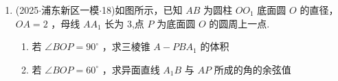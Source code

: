 \begin{enumerate}
\begin{jieda}
\begin{enumerate}
            方法二: 因为 ${PA} \bot$ 平面 ${ABCD},{AC},{AD},{CD} \subset$ 平面 ${ABCD}$ , 所以 ${PA} \bot  {AC},{PA} \bot  {AD},{PA} \bot  {CD}$ 且 $\angle {PCA}$ 就是 ${PC}$ 与平面 ${ABCD}$ 所成的角,又因为四边形 ${ABCD}$ 为矩形,所以 ${AB} \bot  {AD}$ ,分别以射线 ${AB},{AD},{AP}$ 为 $x,y,z$ 轴的正半轴,建立空间直角坐标系 $A - {xyz}$ ,设 ${AB} = t,{\vv{n}}_{1} = \left( {x,y,1}\right)$ 是平面 ${AEC}$ 的一个法向量,二面角 $D - {AE} - C$ 的大小为 $\theta$ ,

            由 $\tan \angle {PCA} = \dfrac{PA}{AC} = \dfrac{2}{\sqrt{{12} + {t}^{2}}} = \dfrac{1}{3}$ ,可得 $t = 2\sqrt{6}$ ,

            则 $\vv{AC} = \left( {2\sqrt{6},2\sqrt{3},0}\right) ,\vv{AE} = \left( {0,\sqrt{3},1}\right)$ ,故

            $\left\{  \begin{array}{l} {\vv{n}}_{1} \cdot  \vv{AC} = \left( {x,y,1}\right)  \cdot  \left( {2\sqrt{6},2\sqrt{3},0}\right)  = 2\sqrt{6}x + 2\sqrt{3}y = 0 \\  {\vv{n}}_{1} \cdot  \vv{AE} = \left( {x,y,1}\right)  \cdot  \left( {0,\sqrt{3},1}\right)  = \sqrt{3}y + 1 = 0 \end{array}\right.$

            解得 $x = \dfrac{\sqrt{6}}{6}$ 且 $y =  - \dfrac{\sqrt{3}}{3}$ ,所以 ${\vv{n}}_{1} = \left( {\dfrac{\sqrt{6}}{6}, - \dfrac{\sqrt{3}}{3},1}\right)$ ,又 ${\vv{n}}_{2} =  \left( {1,0,0}\right)$ 是平面 ${AED}$ 的一个法向量,且 $\theta$ 为锐角,故 $\cos \theta  =  \dfrac{\left| {\vv{n}}_{1} \cdot  {\vv{n}}_{2}\right| }{\left| {\vv{n}}_{1}\right|  \cdot  \left| {\vv{n}}_{2}\right| } = \dfrac{\left| \left( \dfrac{\sqrt{6}}{6}, - \dfrac{\sqrt{3}}{3},1\right)  \cdot  \left( 1,0,0\right) \right| }{\sqrt{\dfrac{1}{6} + \dfrac{1}{3} + 1}} = \dfrac{1}{3}$ ,可得 $\theta  =  \arccos \dfrac{1}{3}$ ,所以二面角 $D - {AE} - C$ 的大小为 $\arccos \dfrac{1}{3}$ .
        \end{enumerate}
    \end{jieda}
    
    \item (2025$\cdot$浦东新区一模$\cdot$18)如图所示，已知 ${AB}$ 为圆柱 $O{O}_{1}$ 底面圆 $O$ 的直径， ${OA} = 2$ ，母线 $A{A}_{1}$ 长为 3,点 $P$ 为底面圆 $O$ 的圆周上一点.
    \begin{enumerate}
        \item 若 $\angle {BOP} = {90}^{ \circ  }$ ，求三棱锥 $A - {PB}{A}_{1}$ 的体积
        \item 若 $\angle {BOP} = {60}^{ \circ  }$ ，求异面直线 ${A}_{1}B$ 与 ${AP}$ 所成的角的余弦值
    \end{enumerate}


\end{enumerate}
